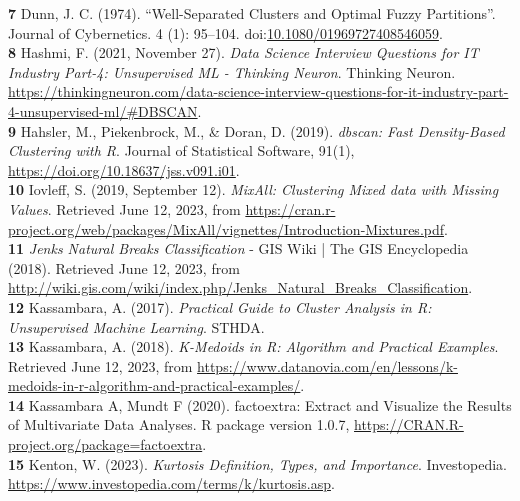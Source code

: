 \documentclass[11pt, a4paper]{article}
\begin{document}
\noindent\textbf{7} Dunn, J. C. (1974). ``Well-Separated Clusters and Optimal Fuzzy Partitions''. Journal of Cybernetics. 4 (1): 95–104. doi:\sloppy\url{10.1080/01969727408546059}. \\

\noindent\textbf{8} Hashmi, F. (2021, November 27). \textit{Data Science Interview Questions for IT Industry Part-4: Unsupervised ML - Thinking 	Neuron}. Thinking Neuron. \sloppy\url{https://thinkingneuron.com/data-science-interview-questions-for-it-industry-part-4-unsupervised-ml/\#DBSCAN}. \\

\noindent\textbf{9} Hahsler, M., Piekenbrock, M., \& Doran, D. (2019). \textit{dbscan: Fast Density-Based Clustering with R}. Journal of Statistical Software, 91(1), \sloppy\url{https://doi.org/10.18637/jss.v091.i01}. \\

\noindent\textbf{10} Iovleff, S. (2019, September 12). \textit{MixAll: Clustering Mixed data with Missing Values}. Retrieved June 12, 2023, from \sloppy\url{https://cran.r-project.org/web/packages/MixAll/vignettes/Introduction-Mixtures.pdf}. \\

\noindent\textbf{11} \textit{Jenks Natural Breaks Classification} - GIS Wiki | The GIS Encyclopedia (2018). Retrieved June 12, 2023, from \sloppy\url{http://wiki.gis.com/wiki/index.php/Jenks_Natural_Breaks_Classification}. \\

\noindent\textbf{12} Kassambara, A. (2017). \textit{Practical Guide to Cluster Analysis in R: Unsupervised Machine Learning}. STHDA. \\

\noindent\textbf{13} Kassambara, A. (2018). \textit{K-Medoids in R: Algorithm and Practical Examples}. Retrieved June 12, 2023, from \sloppy\url{https://www.datanovia.com/en/lessons/k-medoids-in-r-algorithm-and-practical-examples/}. \\

\noindent\textbf{14} Kassambara A, Mundt F (2020). factoextra: Extract and Visualize the Results of Multivariate Data Analyses. R package version 1.0.7, \sloppy\url{https://CRAN.R-project.org/package=factoextra}. \\

\noindent\textbf{15} Kenton, W. (2023). \textit{Kurtosis Definition, Types, and Importance}. Investopedia. \sloppy\url{https://www.investopedia.com/terms/k/kurtosis.asp}. \\
\end{document}
